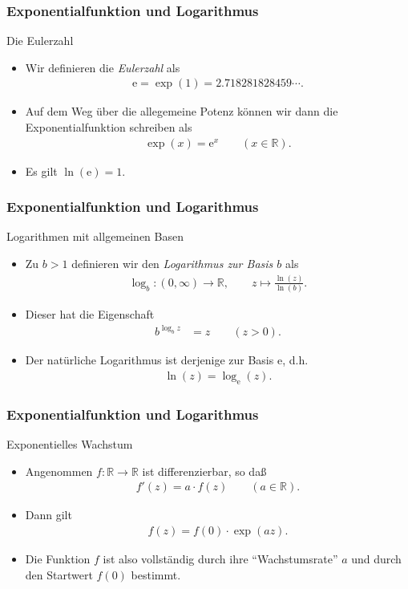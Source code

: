 \documentclass{beamer}
\renewcommand{\emph}[1]{{\textcolor{solarizedRed}{\itshape #1}}}
\newcommand\eul{\mathrm e}
\newcommand\RR{\mathbb R}
\renewcommand{\ae}{\"a}
\renewcommand{\oe}{\"o}
\newcommand{\ue}{\"u}
\newcommand{\mytitle}{Exponentialfunktion und Logarithmus}
\begin{document}
\begin{frame}\frametitle{\mytitle}
	\begin{block}{Die Eulerzahl}
	\begin{itemize}
		\item Wir definieren die \emph{Eulerzahl} als
			\begin{align*}
				\eul=\exp(1)=2.718281828459\cdots.
			\end{align*}
		\item Auf dem Weg \ue ber die allegemeine Potenz k\oe nnen wir dann die Exponentialfunktion schreiben als
			\begin{align*}
				\exp(x)=\eul^x\qquad(x\in\RR).
			\end{align*}
		\item Es gilt $\ln(\eul)=1$.
	\end{itemize}
	\end{block}
\end{frame}

\begin{frame}\frametitle{\mytitle}
	\begin{block}{Logarithmen mit allgemeinen Basen}
	\begin{itemize}
		\item Zu $b>1$ definieren wir den \emph{Logarithmus zur Basis $b$} als
			\begin{align*}
				\log_b:(0,\infty)\to\RR,\qquad z\mapsto\frac{\ln(z)}{\ln(b)}.
			\end{align*}
		\item Dieser hat die Eigenschaft
			\begin{align*}
				b^{\log_b z}&=z\qquad(z>0).
			\end{align*}
		\item Der nat\ue rliche Logarithmus ist derjenige zur Basis $\eul$, d.h.\
			\begin{align*}
				\ln(z)=\log_\eul(z).
			\end{align*}
	\end{itemize}
	\end{block}
\end{frame}

\begin{frame}\frametitle{\mytitle}
	\begin{block}{Exponentielles Wachstum}
	\begin{itemize}
		\item Angenommen $f:\RR\to\RR$ ist differenzierbar, so da\ss
			\begin{align*}
				f'(z)=a\cdot f(z)\qquad(a\in\RR).
			\end{align*}
		\item Dann gilt
			\begin{align*}
				f(z)=f(0)\cdot\exp(a z).
			\end{align*}
		\item Die Funktion $f$ ist also vollst\ae ndig durch ihre ``Wachstumsrate'' $a$ und durch den Startwert $f(0)$ bestimmt.
	\end{itemize}
	\end{block}
\end{frame}
\end{document}
